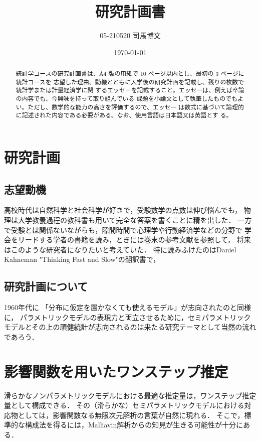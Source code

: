 \documentclass[uplatex, dvipdfmx]{jsarticle}
\title{研究計画書}
\author{05-210520 司馬博文}
\date{\today}
\begin{document}
\begin{abstract}
    統計学コースの研究計画書は、A4 版の用紙で 10 ページ以内とし、最初の 3 ページに統計コースを
    志望した理由、動機とともに入学後の研究計画を記載し、残りの枚数で統計学または計量経済学に関
    するエッセーを記載すること。エッセーは、例えば卒論の内容でも、今興味を持って取り組んでいる
    課題を小論文として執筆したものでもよい。ただし、数学的な能力の高さを評価するので、エッセー
    は数式に基づいて論理的に記述された内容である必要がある。なお、使用言語は日本語又は英語とす
    る。
\end{abstract}

\section{研究計画}

\subsection{志望動機}

高校時代は自然科学と社会科学が好きで，受験数学の点数は伸び悩んでも，
物理は大学教養過程の教科書も用いて完全な答案を書くことに精を出した．
一方で受験とは関係ないながらも，隙間時間で心理学や行動経済学などの分野で
学会をリードする学者の書籍を読み，ときには巻末の参考文献を参照して，
将来はこのような研究者になりたいと考えていた．
特に読みふけたのはDaniel Kahneman "Thinking Fast and Slow"の翻訳書\cite{Kahneman}で，

\subsection{研究計画について}

1960年代に
「分布に仮定を置かなくても使えるモデル」が志向されたのと同様に，
パラメトリックモデルの表現力と両立させるために，セミパラメトリックモデルとその上の頑健統計が志向されるのは来たる研究テーマとして当然の流れであろう．

\section{影響関数を用いたワンステップ推定}

\begin{tcolorbox}[colframe=ForestGreen, colback=ForestGreen!10!white,breakable,colbacktitle=ForestGreen!40!white,coltitle=black,fonttitle=\bfseries\sffamily,
title=]
    滑らかなノンパラメトリックモデルにおける最適な推定量は，ワンステップ推定量として構成できる．
    その（滑らかな）セミパラメトリックモデルにおける対応物としては，影響関数なる無限次元解析の言葉が自然に現れる．
    そこで，標準的な構成法を得るには，Malliavin解析からの知見が生きる可能性が十分にある．
\end{tcolorbox}
\end{document}
